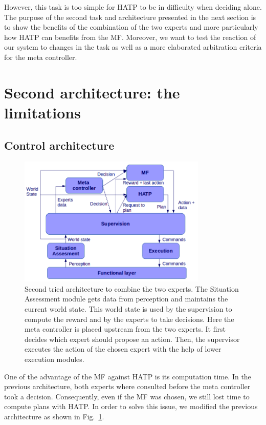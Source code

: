 \documentclass[english,a4paper,11pt,twoside]{StyleThese}
\begin{document}
However, this task is too simple for HATP to be in difficulty when deciding alone. The purpose of the second task and architecture presented in the next section is to show the benefits of the combination of the two experts and more particularly how HATP can benefits from the MF. Moreover, we want to test the reaction of our system to changes in the task as well as a more elaborated arbitration criteria for the meta controller.


\section{Second architecture: the limitations}

\subsection{Control architecture}

\begin{figure}[!h]
	\centering
    \includegraphics[width=0.8\textwidth]{figs/Chapter7/SecondArchi.png}
    \caption{Second tried architecture to combine the two experts. The Situation Assessment module gets data from perception and maintains the current world state. This world state is used by the supervision to compute the reward and by the experts to take decisions. Here the meta controller is placed upstream from the two experts. It first decides which expert should propose an action. Then, the supervisor executes the action of the chosen expert with the help of lower execution modules.}
    \label{fig:SecondArchi}
\end{figure}

One of the advantage of the MF against HATP is its computation time. In the previous architecture, both experts where consulted before the meta controller took a decision. Consequently, even if the MF was chosen, we still lost time to compute plans with HATP. In order to solve this issue, we modified the previous architecture as shown in Fig.~\ref{fig:SecondArchi}. 
\end{document}
